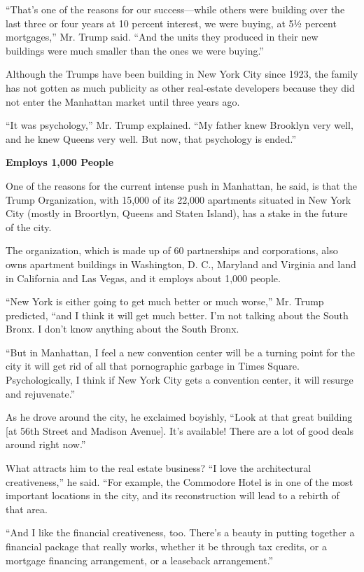 ``That's one of the reasons for our success---while others were building
over the last three or four years at 10 percent interest, we were
buying, at 5½ percent mortgages,'' Mr. Trump said. ``And the units they
produced in their new buildings were much smaller than the ones we were
buying.''

Although the Trumps have been building in New York City since 1923, the
family has not gotten as much publicity as other real‐estate developers
because they did not enter the Manhattan market until three years ago.

``It was psychology,'' Mr. Trump explained. ``My father knew Brooklyn
very well, and he knew Queens very well. But now, that psychology is
ended.''

\textbf{Employs 1,000 People}

One of the reasons for the current intense push in Manhattan, he said,
is that the Trump Organization, with 15,000 of its 22,000 apartments
situated in New York City (mostly in Broortlyn, Queens and Staten
Island), has a stake in the future of the city.

The organization, which is made up of 60 partnerships and corporations,
also owns apartment buildings in Washington, D. C., Maryland and
Virginia and land in California and Las Vegas, and it employs about
1,000 people.

``New York is either going to get much better or much worse,'' Mr. Trump
predicted, ``and I think it will get much better. I'm not talking about
the South Bronx. I don't know anything about the South Bronx.

``But in Manhattan, I feel a new convention center will be a turning
point for the city it will get rid of all that pornographic garbage in
Times Square. Psychologically, I think if New York City gets a
convention center, it will resurge and rejuvenate.''

As he drove around the city, he exclaimed boyishly, ``Look at that great
building {[}at 56th Street and Madison Avenue{]}. It's available! There
are a lot of good deals around right now.''

What attracts him to the real estate business? ``I love the
architectural creativeness,'' he said. ``For example, the Commodore
Hotel is in one of the most important locations in the city, and its
reconstruction will lead to a rebirth of that area.

``And I like the financial creativeness, too. There's a beauty in
putting together a financial package that really works, whether it be
through tax credits, or a mortgage financing arrangement, or a leaseback
arrangement.''

